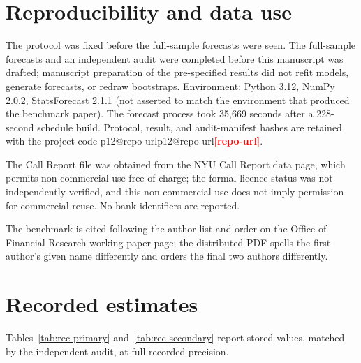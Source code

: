 \documentclass[11pt]{article}
\makeatletter
\newcommand{\val}[1]{\ifcsname p12@#1\endcsname\csname p12@#1\endcsname\else\textcolor{red}{\textbf{[#1]}}\fi}
\makeatother
\begin{document}
\section{Reproducibility and data use}\label{sec:repro}
The protocol was fixed before the full-sample forecasts were seen. The full-sample forecasts and an independent audit were completed before this manuscript was drafted; manuscript preparation of the pre-specified results did not refit models, generate forecasts, or redraw bootstraps. Environment: Python 3.12, NumPy 2.0.2, StatsForecast 2.1.1 (not asserted to match the environment that produced the benchmark paper). The forecast process took 35,669 seconds after a 228-second schedule build. Protocol, result, and audit-manifest hashes are retained with the project code \val{repo-url}.

The Call Report file was obtained from the NYU Call Report data page, which permits non-commercial use free of charge; the formal licence status was not independently verified, and this non-commercial use does not imply permission for commercial reuse. No bank identifiers are reported.

The benchmark is cited following the author list and order on the Office of Financial Research working-paper page; the distributed PDF spells the first author's given name differently and orders the final two authors differently.

\appendix
\section{Recorded estimates}\label{app:recorded}
Tables~\ref{tab:rec-primary} and~\ref{tab:rec-secondary} report stored values, matched by the independent audit, at full recorded precision.
\end{document}
